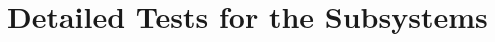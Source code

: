 \documentclass[a4paper,12pt]{article}
\begin{document}

































\section{Detailed Tests for the Subsystems}\label{test_sec}
\end{document}
